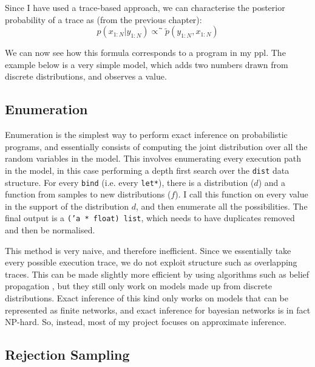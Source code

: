 Since I have used a trace-based approach, we can characterise the posterior probability of a trace as (from the previous chapter):
$$p(x_{1:N}|y_{1:N})\propto ̃\tilde{p}(y_{1:N},x_{1:N})$$

We can now see how this formula corresponds to a program in my ppl. The example below is a very simple model, which adds two numbers drawn from discrete distributions, and observes a value.


\subsection{Enumeration} \label{sec:enum}
Enumeration is the simplest way to perform exact inference on probabilistic programs, and essentially consists of computing the joint distribution over all the random variables in the model. This involves enumerating every execution path in the model, in this case performing a depth first search over the \texttt{dist} data structure. For every \texttt{bind} (i.e. every \texttt{let*}), there is a distribution ($d$) and a function from samples to new distributions ($f$). I call this function on every value in the support of the distribution $d$, and then enumerate all the possibilities. The final output is a \texttt{('a * float) list}, which needs to have duplicates removed and then be normalised.



This method is very naive, and therefore inefficient. Since we essentially take every possible execution trace, we do not exploit structure such as overlapping traces. This can be made slightly more efficient by using algorithms such as belief propagation \cite{belief-prop}, but they still only work on models made up from discrete distributions. Exact inference of this kind only works on models that can be represented as finite networks, and exact inference for bayesian networks is in fact NP-hard\cite{cooper1990computational}. So, instead, most of my project focuses on approximate inference.

\subsection{Rejection Sampling} \label{sec:rej}
